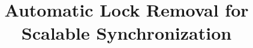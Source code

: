 \documentclass[pldi]{sigplanconf-pldi15}
\newcommand{\doi}[1]{doi:~\href{http://dx.doi.org/#1}{\Hurl{#1}}}   %
\begin{document}






%
%
%
%
%
%

\title{Automatic Lock Removal for Scalable Synchronization}
%

\maketitle
\end{document}
